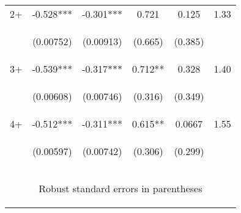 \documentclass{article}[11pt,subeqn]
\begin{document}
\begin{spacing}{1.25}
\begin{table}[!htbp]
\begin{center}
\begin{tabular}{lccccc}
2+ & -0.528*** &	-0.301*** &	0.721 & 0.125 & 1.33 \\
\vspace{4pt} & \begin{footnotesize}(0.00752)\end{footnotesize} & \begin{footnotesize}(0.00913)\end{footnotesize}  & \begin{footnotesize}(0.665)\end{footnotesize} & \begin{footnotesize}(0.385)\end{footnotesize} & \begin{footnotesize}\end{footnotesize} \\
3+ &-0.539*** & -0.317*** & 0.712** & 0.328 & 1.40 \\
\vspace{4pt} & \begin{footnotesize}(0.00608)\end{footnotesize}& \begin{footnotesize}(0.00746)\end{footnotesize} & \begin{footnotesize}(0.316)\end{footnotesize} & \begin{footnotesize}(0.349)\end{footnotesize}  & \begin{footnotesize}\end{footnotesize} \\
4+ & -0.512*** & -0.311*** & 0.615** & 0.0667  & 1.55 \\
\vspace{4pt} & \begin{footnotesize}(0.00597)\end{footnotesize} & \begin{footnotesize}(0.00742)\end{footnotesize} & \begin{footnotesize}(0.306)\end{footnotesize} & \begin{footnotesize}(0.299)\end{footnotesize} & \begin{footnotesize}\end{footnotesize} \\
\midrule
\multicolumn{6}{c}{\begin{footnotesize} Robust standard errors in parentheses\end{footnotesize}} \\

\end{tabular}
\end{center}
\end{table}
\end{spacing}
\end{document}
